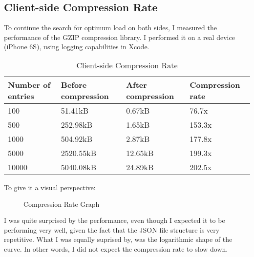 \newpage

\subsection{Client-side Compression Rate}

To continue the search for optimum load on both sides, I measured the performance of the GZIP compression library. I performed it on a real device (iPhone 6S), using logging capabilities in Xcode. 

\begin{table}[!ht]
\begin{center}
\begin{tabular}{|l|l|l|l|}
\hline
\textbf{Number of entries} & \textbf{Before compression} & \textbf{After compression} & \textbf{Compression rate} \\
\hline
100 & 51.41kB & 0.67kB & 76.7x \\
\hline
500 & 252.98kB & 1.65kB & 153.3x \\
\hline
1000 & 504.92kB & 2.87kB & 177.8x \\
\hline
5000 & 2520.55kB & 12.65kB & 199.3x \\
\hline
10000 & 5040.08kB & 24.89kB & 202.5x \\
\hline
\end{tabular}
\end{center}
\caption{Client-side Compression Rate}
\label{tab:compression}
\end{table}

To give it a visual perspective:

\begin{figure}[!ht]
\begin{center}
\end{center}
\caption{Compression Rate Graph}
\end{figure}

I was quite surprised by the performance, even though I expected it to be performing very well, given the fact that the JSON file structure is very repetitive. What I was equally suprised by, was the logarithmic shape of the curve. In other words, I did not expect the compression rate to slow down.

